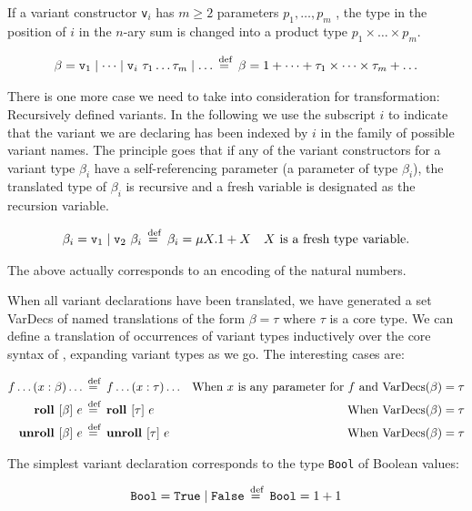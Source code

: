 If a variant constructor \texttt{v}$_i$ has $m \ge 2$ parameters $p_1, \dots,
p_m$ , the type in the position of $i$ in the $n$-ary sum is changed into a
product type $p_1 \times \dots \times p_m$.

\begin{align*}
  \beta = \texttt{v}_1 \mid \dots \mid \texttt{v}_i~\tau_1 \dots \tau_m \mid \dots
  \stackrel{\>\text{def}}{=}\> \beta =  1 + \dots + \tau_1 \times \dots \times \tau_m + \dots
\end{align*}

There is one more case we need to take into consideration for transformation:
Recursively defined variants. In the following we use the subscript $i$ to
indicate that the variant we are declaring has been indexed by $i$ in the
family of possible variant names. The principle goes that if any of the variant
constructors for a variant type $\beta_i$ have a self-referencing parameter (a
parameter of type $\beta_i$), the translated type of $\beta_i$ is recursive and
a fresh variable is designated as the recursion variable.

\begin{align*}
  &\beta_i = \texttt{v}_1 \mid \texttt{v}_2~\beta_i
  \stackrel{\>\text{def}}{=}\> \beta_i = \mu X.1 + X & \text{$X$ is a fresh type variable.}
\end{align*}

The above actually corresponds to an encoding of the natural numbers.

When all variant declarations have been translated, we have generated a set
VarDecs of named translations of the form $\beta = \tau$ where $\tau$ is a core
type. We can define a translation of occurrences of variant types inductively
over the core syntax of \rfunc, expanding variant types as we go. The
interesting cases are:

\begin{align*}
  f \dots (x:\beta) \dots &\stackrel{\>\text{def}}{=}\> f \dots (x:\tau) \dots
  & \text{When $x$ is any parameter for $f$ and VarDecs$(\beta) = \tau$} \\
  \textbf{roll } [\beta]\ e &\stackrel{\>\text{def}}{=}\> \textbf{roll } [\tau]\ e &\text{When VarDecs$(\beta) = \tau$} \\
  \textbf{unroll } [\beta]\ e &\stackrel{\>\text{def}}{=}\> \textbf{unroll } [\tau]\ e &\text{When VarDecs$(\beta) = \tau$}
\end{align*}

The simplest variant declaration corresponds to the type \texttt{Bool} of
Boolean values:

\begin{align*}
  \texttt{Bool} = \texttt{True} \mid \texttt{False} \stackrel{\>\text{def}}{=}\>
  \texttt{Bool} = 1 + 1
\end{align*}

